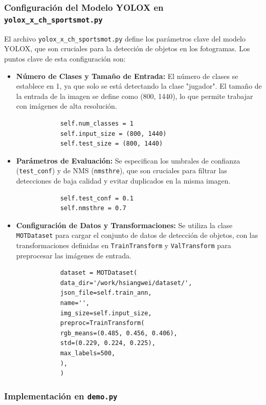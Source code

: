 \documentclass[12pt, a4paper, twoside]{article}
\begin{document}
	\subsubsection{Configuración del Modelo YOLOX en \texttt{yolox\_x\_ch\_sportsmot.py}}
	
	El archivo \texttt{yolox\_x\_ch\_sportsmot.py} define los parámetros clave del modelo YOLOX, que son cruciales para la detección de objetos en los fotogramas. Los puntos clave de esta configuración son:
	
	\begin{itemize}
		\item \textbf{Número de Clases y Tamaño de Entrada:} El número de clases se establece en 1, ya que solo se está detectando la clase "jugador". El tamaño de la entrada de la imagen se define como (800, 1440), lo que permite trabajar con imágenes de alta resolución.
		\begin{verbatim}
			self.num_classes = 1
			self.input_size = (800, 1440)
			self.test_size = (800, 1440)
		\end{verbatim}
		
		\item \textbf{Parámetros de Evaluación:} Se especifican los umbrales de confianza (\texttt{test\_conf}) y de NMS (\texttt{nmsthre}), que son cruciales para filtrar las detecciones de baja calidad y evitar duplicados en la misma imagen.
		\begin{verbatim}
			self.test_conf = 0.1
			self.nmsthre = 0.7
		\end{verbatim}
		
		\item \textbf{Configuración de Datos y Transformaciones:} Se utiliza la clase \texttt{MOTDataset} para cargar el conjunto de datos de detección de objetos, con las transformaciones definidas en \texttt{TrainTransform} y \texttt{ValTransform} para preprocesar las imágenes de entrada.
		\begin{verbatim}
			dataset = MOTDataset(
			data_dir='/work/hsiangwei/dataset/',
			json_file=self.train_ann,
			name='',
			img_size=self.input_size,
			preproc=TrainTransform(
			rgb_means=(0.485, 0.456, 0.406),
			std=(0.229, 0.224, 0.225),
			max_labels=500,
			),
			)
		\end{verbatim}
	\end{itemize}
	
	\subsubsection{Implementación en \texttt{demo.py}}
	
\end{document}
